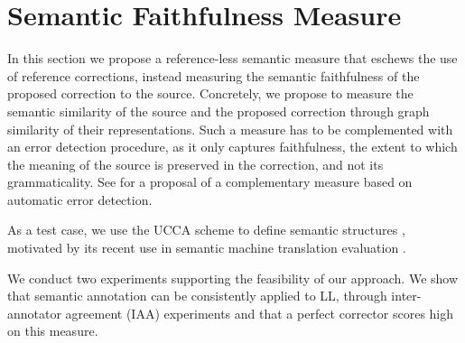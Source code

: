\documentclass[letter,11pt]{article}
\begin{document}
\section{Semantic Faithfulness Measure}\label{sec:Semantics}
%
%
%
%

In this section we propose a reference-less semantic measure that eschews the use
of reference corrections, instead measuring the semantic faithfulness of the proposed
correction to the source.
Concretely, we propose to measure the semantic similarity of the source and the proposed correction
through graph similarity of their representations.
Such a measure has to be complemented with an
error detection procedure, as it only captures faithfulness, the extent to which
the meaning of the source is preserved in the correction,
and not its grammaticality.
See 
for a proposal of a complementary measure based
on automatic error detection.

As a test case, we use the UCCA scheme to define semantic structures \cite{abend2013universal},
motivated by its recent use in semantic machine translation evaluation \cite{birch2016hume}.

We conduct two experiments supporting the feasibility of our approach.
We show that semantic annotation can be consistently applied to LL,
through inter-annotator agreement (IAA) experiments and that a perfect corrector scores high on this measure.
\end{document}
